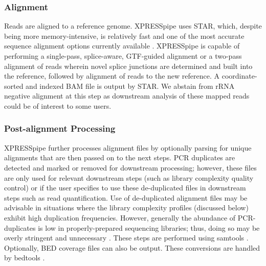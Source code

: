 \documentclass[10pt, oneside]{article}
\begin{document}
\subsubsection{Alignment}
Reads are aligned to a reference genome. XPRESSpipe uses STAR, which, despite being more memory-intensive, is relatively fast and one of the most accurate sequence alignment options currently available \cite{star, baruzzo_natmeth}. XPRESSpipe is capable of performing a single-pass, splice-aware, GTF-guided alignment or a two-pass alignment of reads wherein novel splice junctions are determined and built into the reference, followed by alignment of reads to the new reference. A coordinate-sorted and indexed BAM file is output by STAR. We abstain from rRNA negative alignment at this step as downstream analysis of these mapped reads could be of interest to some users.

\subsubsection{Post-alignment Processing}
XPRESSpipe further processes alignment files by optionally parsing for unique alignments that are then passed on to the next steps. PCR duplicates are detected and marked or removed for downstream processing; however, these files are only used for relevant downstream steps (such as library complexity quality control) or if the user specifies to use these de-duplicated files in downstream steps such as read quantification. Use of de-duplicated alignment files may be advisable in situations where the library complexity profiles (discussed below) exhibit high duplication frequencies. However, generally the abundance of PCR-duplicates is low in properly-prepared sequencing libraries; thus, doing so may be overly stringent and unnecessary \cite{umi}. These steps are performed using samtools \cite{samtools}. Optionally, BED coverage files can also be output. These conversions are handled by bedtools \cite{bedtools}.
\end{document}
